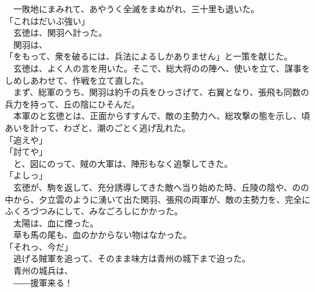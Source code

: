 \documentclass[
  paper=a5,
  fontsize=10pt,
  jafontsize=9.5pt,
  tate,                  %
  open_bracket_pos=nibu, %
]{jlreq}
\begin{document}
　一敗地にまみれて、あやうく全滅をまぬがれ、三十里も退いた。\\


「これはだいぶ強い」\\


　玄徳は、関羽へ計った。\\


　関羽は、\\


「をもって、衆を破るには、兵法によるしかありません」と一策を献じた。\\


　玄徳は、よく人の言を用いた。そこで、総大将のの陣へ、使いを立て、謀事をしめしあわせて、作戦を立て直した。\\


　まず、総軍のうち、関羽は約千の兵をひっさげて、右翼となり、張飛も同数の兵力を持って、丘の陰にひそんだ。\\


　本軍のと玄徳とは、正面からすすんで、敵の主勢力へ、総攻撃の態を示し、頃あいを計って、わざと、潮のごとく逃げ乱れた。\\


「追えや」\\


「討てや」\\


　と、図にのって、賊の大軍は、陣形もなく追撃してきた。\\


「よしっ」\\


　玄徳が、駒を返して、充分誘導してきた敵へ当り始めた時、丘陵の陰や、のの中から、夕立雲のように湧いて出た関羽、張飛の両軍が、敵の主勢力を、完全にふくろづつみにして、みなごろしにかかった。\\


　太陽は、血に煙った。\\


　草も馬の尾も、血のかからない物はなかった。\\


「それっ、今だ」\\


　逃げる賊軍を追って、そのまま味方は青州の城下まで迫った。\\


　青州の城兵は、\\


　――援軍来る！\\
\end{document}
